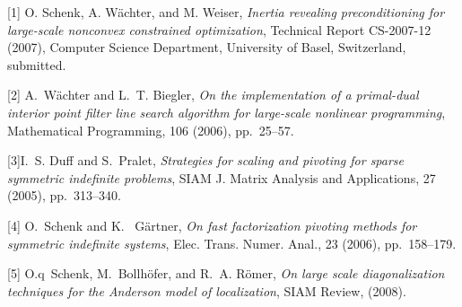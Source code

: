 \documentclass{report}
\begin{document}
[1] {\sc O. Schenk, A. W\"achter, and M. Weiser}, {\em Inertia revealing
preconditioning for large-scale nonconvex constrained optimization},
Technical Report CS-2007-12 (2007), Computer Science Department, University
of Basel, Switzerland, submitted.

[2] {\sc A.~W\"achter and L.~T. Biegler}, {\em On the implementation of a
primal-dual interior point filter line search algorithm for large-scale
nonlinear programming}, Mathematical Programming, 106 (2006), pp.~25--57.

[3]{\sc I.~S. Duff and S.~Pralet}, {\em Strategies for scaling and pivoting
for sparse symmetric indefinite problems}, SIAM J. Matrix Analysis and
Applications, 27 (2005), pp.~313--340.

[4] {\sc O.~Schenk and K. ~G\"artner}, {\em On fast factorization pivoting
methods for symmetric indefinite systems}, Elec. Trans. Numer. Anal., 23
(2006), pp.~158--179.

[5] {\sc O.q~Schenk, M.~Bollh\"ofer, and R.~A. R\"omer}, {\em On large scale
diagonalization techniques for the {Anderson} model of localization}, SIAM
Review, (2008).
\end{document}
